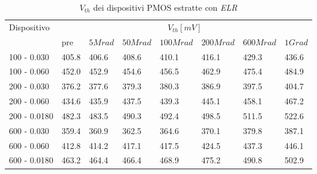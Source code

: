 \documentclass[12pt, letterpaper]{book}
\begin{document}
\begin{table}[H]
  \renewcommand{\arraystretch}{1.3}
  \begin{tabular}{m{2.1cm} m{0.8cm} m{1.1cm} m{1.3cm} m{1.5cm} m{1.5cm} m{1.5cm} m{1cm}}
    \toprule
    \multirow{2}{*}{Dispositivo} & \multicolumn{7}{c}{$V_{th} [mV] $}                                                                    \\
    \cmidrule{2-8}
                                 & pre                                & $5Mrad$ & $50Mrad$ & $100Mrad$ & $200Mrad$ & $600Mrad$ & $1Grad$ \\
    \midrule
    100 - 0.030                     & 405.8                              & 406.6   & 408.6    & 410.1     & 416.1     & 429.3     & 436.6   \\
    \hline
    100 - 0.060                     & 452.0                              & 452.9   & 454.6    & 456.5     & 462.9     & 475.4     & 484.9   \\
    \hline
    200 - 0.030                     & 376.2                              & 377.6   & 379.3    & 380.3     & 386.9     & 397.5     & 404.7   \\
    \hline
    200 - 0.060                     & 434.6                              & 435.9   & 437.5    & 439.3     & 445.1     & 458.1     & 467.2   \\
    \hline
    200 - 0.0180                    & 482.3                              & 483.5   & 490.3    & 492.4     & 498.5     & 511.5     & 522.6   \\
    \hline
    600 - 0.030                     & 359.4                              & 360.9   & 362.5    & 364.6     & 370.1     & 379.8     & 387.1   \\
    \hline
    600 - 0.060                     & 412.8                              & 414.2   & 417.1    & 417.5     & 424.5     & 437.3     & 446.1   \\
    \hline
    600 - 0.0180                    & 463.2                              & 464.4   & 466.4    & 468.9     & 475.2     & 490.8     & 502.9   \\
    \bottomrule
  \end{tabular}

  \caption{$V_{th}$ dei dispositivi PMOS estratte con \emph{ELR}}
  \label{tab:VthELRP}
\end{table}
\end{document}
